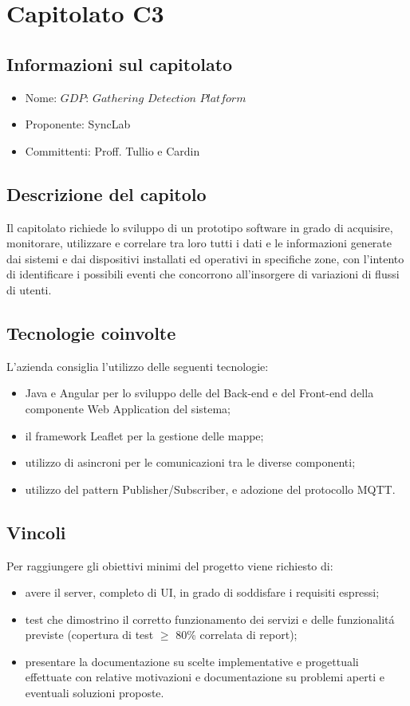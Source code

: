 \section{Capitolato C3}
\subsection{Informazioni sul capitolato}
\begin{itemize}
\item Nome: $GDP$: $Gathering$ $Detection$ $Platform$ 
\item Proponente: SyncLab
\item Committenti: Proff. Tullio e Cardin
\end{itemize}

\subsection{Descrizione del capitolo}
Il capitolato richiede lo sviluppo di un prototipo software in grado di acquisire, monitorare, utilizzare e correlare tra loro tutti i dati e le informazioni generate dai sistemi e dai dispositivi installati ed operativi in specifiche zone, con l’intento di identificare i possibili eventi che concorrono all’insorgere di variazioni di flussi di utenti.

\subsection{Tecnologie coinvolte}
L'azienda consiglia l'utilizzo delle seguenti tecnologie:
\begin{itemize}
\item Java e Angular per lo sviluppo delle del Back-end e del Front-end della componente Web Application del sistema;
\item il framework Leaflet per la gestione delle mappe;
\item utilizzo di asincroni per le comunicazioni tra le diverse componenti;
\item utilizzo del pattern Publisher/Subscriber, e adozione del protocollo MQTT. 
\end{itemize}

\subsection{Vincoli}
Per raggiungere gli obiettivi minimi del progetto viene richiesto di:

\begin{itemize}
\item avere il server, completo di UI, in grado di soddisfare i requisiti espressi; 
\item test che dimostrino il corretto funzionamento dei servizi e delle funzionalit\'a previste (copertura di test $\geq$ 80\% correlata di report);
\item presentare la documentazione su scelte implementative e progettuali effettuate con relative motivazioni e documentazione su problemi aperti e eventuali soluzioni proposte.
\end{itemize}

